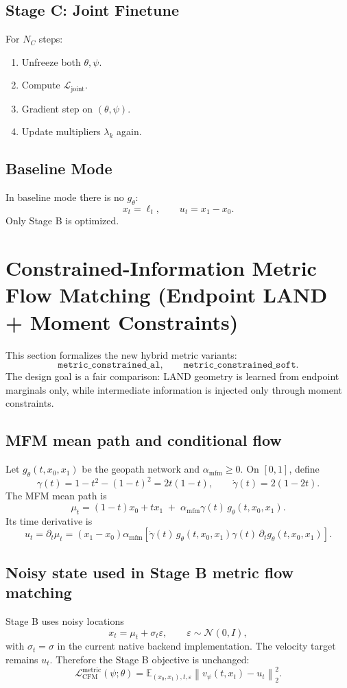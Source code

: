 \documentclass[11pt]{article}
\begin{document}
\subsection*{Stage C: Joint Finetune}
For $N_C$ steps:
\begin{enumerate}
    \item Unfreeze both $\theta,\psi$.
    \item Compute $\mathcal{L}_{\mathrm{joint}}$.
    \item Gradient step on $(\theta,\psi)$.
    \item Update multipliers $\lambda_k$ again.
\end{enumerate}

\subsection*{Baseline Mode}
In baseline mode there is no $g_\theta$:
\[
x_t=\ell_t,\qquad u_t=x_1-x_0.
\]
Only Stage B is optimized.

\section{Constrained-Information Metric Flow Matching (Endpoint LAND + Moment Constraints)}
This section formalizes the new hybrid metric variants:
\[
\texttt{metric\_constrained\_al},\qquad
\texttt{metric\_constrained\_soft}.
\]
The design goal is a fair comparison: LAND geometry is learned from endpoint marginals only, while intermediate information is injected only through moment constraints.

\subsection*{MFM mean path and conditional flow}
Let $g_\theta(t,x_0,x_1)$ be the geopath network and $\alpha_{\mathrm{mfm}}\ge 0$.
On $[0,1]$, define
\[
\gamma(t)=1-t^2-(1-t)^2=2t(1-t),\qquad
\dot{\gamma}(t)=2(1-2t).
\]
The MFM mean path is
\[
\mu_t
=
(1-t)x_0+tx_1
\;+\;
\alpha_{\mathrm{mfm}}\gamma(t)\,g_\theta(t,x_0,x_1).
\]
Its time derivative is
\[
u_t=\partial_t \mu_t
=
(x_1-x_0)
\alpha_{\mathrm{mfm}}
\left[
\dot{\gamma}(t)\,g_\theta(t,x_0,x_1)
\gamma(t)\,\partial_t g_\theta(t,x_0,x_1)
\right].
\]

\subsection*{Noisy state used in Stage B metric flow matching}
Stage B uses noisy locations
\[
x_t=\mu_t+\sigma_t\varepsilon,\qquad \varepsilon\sim\mathcal{N}(0,I),
\]
with $\sigma_t=\sigma$ in the current native backend implementation.
The velocity target remains $u_t$.
Therefore the Stage B objective is unchanged:
\[
\mathcal{L}_{\mathrm{CFM}}^{\mathrm{metric}}(\psi;\theta)
=
\mathbb{E}_{(x_0,x_1),t,\varepsilon}
\left\|
v_\psi(t,x_t)-u_t
\right\|_2^2.
\]
\end{document}
